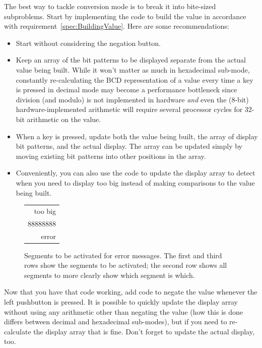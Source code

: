 The best way to tackle conversion mode is to break it into bite-sized
subproblems. Start by implementing the code to build the value in accordance
with requirement~\ref{spec:BuildingValue}. Here are some recommendations:
    \begin{itemize}
    \item Start without considering the negation button.
    \item Keep an array of the bit patterns to be displayed separate from the
        actual value being built. While it won't matter as much in hexadecimal
        sub-mode, constantly re-calculating the BCD representation of a value
        every time a key is pressed in decimal mode may become a performance
        bottleneck since division (and modulo) is not implemented in hardware
        \textit{and} even the (8-bit) hardware-implemented arithmetic will
        require several processor cycles for 32-bit arithmetic on the value.
    \item When a key is pressed, update both the value being built, the
        array of display bit patterns, and the actual display. The array can be
        updated simply by moving existing bit patterns into other positions in
        the array.
    \item Conveniently, you can also use the code to update the display array
        to detect when you need to display {\dviiseg too big} instead of making
        comparisons to the value being built.
    \end{itemize}

\begin{figure}
    \centering
    {\dviiseg \huge \begin{tabular}{r} too big  \\
                                      88888888 \\
                                         error \end{tabular}}
    \caption{Segments to be activated for error messages. The first and third rows show the segments to be activated; the second row shows all segments to more clearly show which segment is which. \label{fig:SevenSegmentError}}
\end{figure}

Now that you have that code working, add code to negate the value whenever the
left pushbutton is pressed. It is possible to quickly update the display array
without using any arithmetic other than negating the value (how this is done
differs between decimal and hexadecimal sub-modes), but if you need to re-
calculate the display array that is fine. Don't forget to update the actual
display, too.

